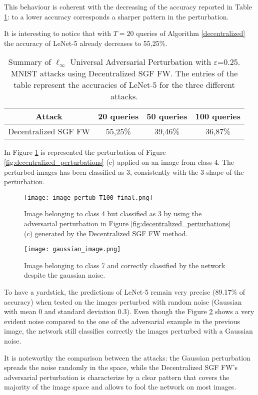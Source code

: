 This behaviour is coherent with the decreasing of the accuracy reported in Table \ref{tab:decentralized}: to a lower accuracy corresponds a sharper pattern in the perturbation.

It is interesting to notice that with $T=20$ queries of Algorithm \ref{decentralized} the accuracy of LeNet-5 already decreases to 55,25\%.
\begin{table}[htbp]
	\begin{center}
		\begin{adjustwidth}{-.6cm}{}
			\begin{tabular}{c|ccc}
				\textbf{Attack} &          20 \textbf{queries} &      50 \textbf{queries} &     100 \textbf{queries} \\
				\midrule
				{\small Decentralized SGF FW}     &    55,25\% &    39,46\% &       36,87\% \\
			\end{tabular}
		\end{adjustwidth}
	\end{center}
	\caption{{\small  Summary of $\ell_\infty$ Universal Adversarial Perturbation with $\varepsilon$=0.25. MNIST attacks using Decentralized SGF FW. The entries of the table represent the accuracies of LeNet-5 for the three different attacks.}}
	\label{tab:decentralized}
\end{table}

In Figure \ref{fig:decentralized} is represented the perturbation of Figure \ref{fig:decentralized_perturbations} (c) applied on an image from class 4. The perturbed images has been classified as 3, consistently with the 3-shape of the perturbation.
\begin{figure}[htbp]
	\centering
	\texttt{[image: image\_pertub\_T100\_final.png]}
	\caption{{\small Image belonging to class 4 but classified as 3 by using the adversarial perturbation in Figure \ref{fig:decentralized_perturbations} (c) generated by the Decentralized SGF FW method.}}
	\label{fig:decentralized}
\end{figure}
\begin{figure}[htbp]
	\centering
	\texttt{[image: gaussian\_image.png]}
	\caption{{\small Image belonging to class 7 and correctly classified by the network despite the gaussian noise.}}
	\label{fig:gaussian_noise}
\end{figure}
To have a yardstick, the predictions of LeNet-5 remain very precise (89.17\% of accuracy) when tested on the images perturbed with random noise (Gaussian with mean 0 and standard deviation 0.3). Even though the Figure \ref{fig:gaussian_noise} shows a very evident noise compared to the one of the adversarial example in the previous image, the network still classifies correctly the images perturbed with a Gaussian noise.

It is noteworthy the comparison between the attacks: the Gaussian perturbation spreads the noise randomly in the space, while the Decentralized SGF FW's adversarial perturbation is characterize by a clear pattern that covers the majority of the image space and allows to fool the network on most images.